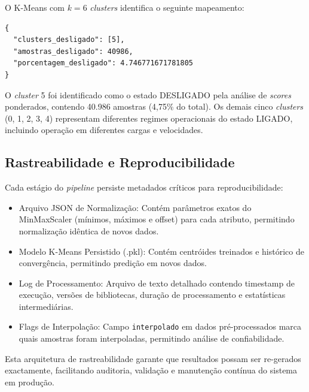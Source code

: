 O K-Means com $k=6$ \textit{clusters} identifica o seguinte mapeamento:

\begin{verbatim}
{
  "clusters_desligado": [5],
  "amostras_desligado": 40986,
  "porcentagem_desligado": 4.746771671781805
}
\end{verbatim}

O \textit{cluster} 5 foi identificado como o estado DESLIGADO pela análise de \textit{scores} ponderados, contendo 40.986 amostras (4,75\% do total). Os demais cinco \textit{clusters} (0, 1, 2, 3, 4) representam diferentes regimes operacionais do estado LIGADO, incluindo operação em diferentes cargas e velocidades.

\subsection{Rastreabilidade e Reproducibilidade}

Cada estágio do \textit{pipeline} persiste metadados críticos para reproducibilidade:

\begin{itemize}
  \item Arquivo JSON de Normalização: Contém parâmetros exatos do MinMaxScaler (mínimos, máximos e offset) para cada atributo, permitindo normalização idêntica de novos dados.
  \item Modelo K-Means Persistido (.pkl): Contém centróides treinados e histórico de convergência, permitindo predição em novos dados.
  \item Log de Processamento: Arquivo de texto detalhado contendo timestamp de execução, versões de bibliotecas, duração de processamento e estatísticas intermediárias.
  \item Flags de Interpolação: Campo \texttt{interpolado} em dados pré-processados marca quais amostras foram interpoladas, permitindo análise de confiabilidade.
\end{itemize}

Esta arquitetura de rastreabilidade garante que resultados possam ser re-gerados exactamente, facilitando auditoria, validação e manutenção contínua do sistema em produção.

\clearpage
